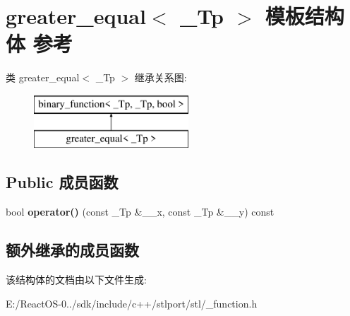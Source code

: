 \hypertarget{structgreater__equal}{}\section{greater\+\_\+equal$<$ \+\_\+\+Tp $>$ 模板结构体 参考}
\label{structgreater__equal}
类 greater\+\_\+equal$<$ \+\_\+\+Tp $>$ 继承关系图\+:\begin{figure}[H]
\begin{center}
\leavevmode
\includegraphics[height=2.000000cm]{structgreater__equal}
\end{center}
\end{figure}
\subsection*{Public 成员函数}
\begin{DoxyCompactItemize}
\item 
\mbox{\label{structgreater__equal_a8ffc5f2cdaa8c93f62626dc3d1002505}} 
bool {\bfseries operator()} (const \+\_\+\+Tp \&\+\_\+\+\_\+x, const \+\_\+\+Tp \&\+\_\+\+\_\+y) const
\end{DoxyCompactItemize}
\subsection*{额外继承的成员函数}


该结构体的文档由以下文件生成\+:\begin{DoxyCompactItemize}
\item 
E\+:/\+React\+O\+S-\/0../sdk/include/c++/stlport/stl/\+\_\+function.\+h\end{DoxyCompactItemize}
